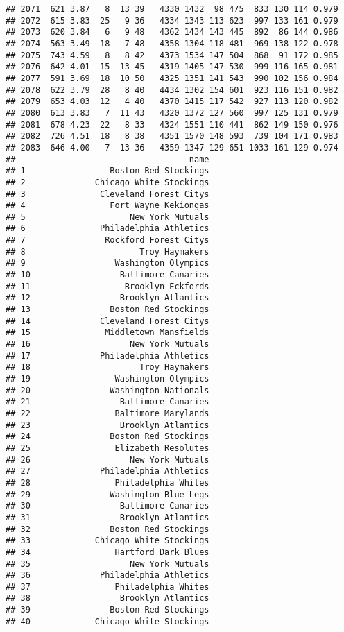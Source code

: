 \documentclass[]{article}
\begin{document}
\begin{verbatim}
## 2071  621 3.87   8  13 39   4330 1432  98 475  833 130 114 0.979
## 2072  615 3.83  25   9 36   4334 1343 113 623  997 133 161 0.979
## 2073  620 3.84   6   9 48   4362 1434 143 445  892  86 144 0.986
## 2074  563 3.49  18   7 48   4358 1304 118 481  969 138 122 0.978
## 2075  743 4.59   8   8 42   4373 1534 147 504  868  91 172 0.985
## 2076  642 4.01  15  13 45   4319 1405 147 530  999 116 165 0.981
## 2077  591 3.69  18  10 50   4325 1351 141 543  990 102 156 0.984
## 2078  622 3.79  28   8 40   4434 1302 154 601  923 116 151 0.982
## 2079  653 4.03  12   4 40   4370 1415 117 542  927 113 120 0.982
## 2080  613 3.83   7  11 43   4320 1372 127 560  997 125 131 0.979
## 2081  678 4.23  22   8 33   4324 1551 110 441  862 149 150 0.976
## 2082  726 4.51  18   8 38   4351 1570 148 593  739 104 171 0.983
## 2083  646 4.00   7  13 36   4359 1347 129 651 1033 161 129 0.974
##                                   name
## 1                 Boston Red Stockings
## 2              Chicago White Stockings
## 3               Cleveland Forest Citys
## 4                 Fort Wayne Kekiongas
## 5                     New York Mutuals
## 6               Philadelphia Athletics
## 7                Rockford Forest Citys
## 8                       Troy Haymakers
## 9                  Washington Olympics
## 10                  Baltimore Canaries
## 11                   Brooklyn Eckfords
## 12                  Brooklyn Atlantics
## 13                Boston Red Stockings
## 14              Cleveland Forest Citys
## 15               Middletown Mansfields
## 16                    New York Mutuals
## 17              Philadelphia Athletics
## 18                      Troy Haymakers
## 19                 Washington Olympics
## 20                Washington Nationals
## 21                  Baltimore Canaries
## 22                 Baltimore Marylands
## 23                  Brooklyn Atlantics
## 24                Boston Red Stockings
## 25                 Elizabeth Resolutes
## 26                    New York Mutuals
## 27              Philadelphia Athletics
## 28                 Philadelphia Whites
## 29                Washington Blue Legs
## 30                  Baltimore Canaries
## 31                  Brooklyn Atlantics
## 32                Boston Red Stockings
## 33             Chicago White Stockings
## 34                 Hartford Dark Blues
## 35                    New York Mutuals
## 36              Philadelphia Athletics
## 37                 Philadelphia Whites
## 38                  Brooklyn Atlantics
## 39                Boston Red Stockings
## 40             Chicago White Stockings

\end{verbatim}
\end{document}
